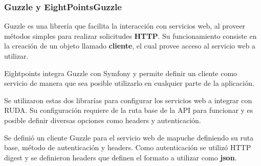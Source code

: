 \subsubsection{Guzzle y EightPointsGuzzle}%
\label{ssub:guzzle}

Guzzle es una librería que facilita la interacción con servicios web, al proveer métodos simples para realizar solicitudes \textbf{HTTP}\@. Su funcionamiento consiste en la creación
de un objeto llamado \textbf{cliente}, el cual provee acceso al servicio web a utilizar.


Eightpoints integra Guzzle con Symfony y permite definir un cliente como servicio de manera que sea posible utilizarlo en cualquier parte de la aplicación.


Se utilizaron estas dos librarías para configurar los servicios web a integrar con RUDA. Su configuración requiere de la ruta base de la API para funcionar y es posible definir
diversas opciones como headers y autenticación.


Se definió un cliente Guzzle para el servicio web de mapuche definiendo su ruta base, método de autenticación y headers. Como autenticación se utilizó HTTP digest y se definieron
 headers que definen el formato a utilizar como \textbf{json}.

